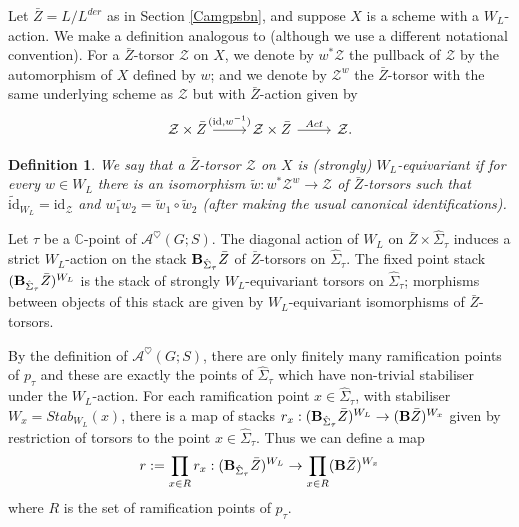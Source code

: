 \documentclass{amsart}
\newtheorem{definition}[theorem]{Definition}
\theoremstyle{remark}
\numberwithin{theorem}{section}
\numberwithin{equation}{section}
\begin{document}
Let $\bar{Z} = L/L^{der}$ as in Section \ref{Camgpsbn}, and suppose $X$ is a scheme with a $W_L$-action. We make a definition analogous to \cite[Definition 5.7]{DG} (although we use a different notational convention). For a $\bar{Z}$-torsor $\mathcal Z$ on $X$, we denote by $w^*\mathcal Z$ the pullback of $\mathcal Z$ by the automorphism of $X$ defined by $w$; and we denote by $\mathcal Z^w$ the $\bar{Z}$-torsor with the same underlying scheme as $\mathcal Z$ but with $\bar{Z}$-action given by
\begin{equation}\label{WTwistTorsoreqn}
\begin{tikzcd}
\mathcal Z \times \bar{Z} \arrow[r, "{(\text{id},w^{-1})}"] & \mathcal Z \times \bar{Z} \arrow[r, "Act"] & \mathcal{Z}.
\end{tikzcd}
\end{equation}

\begin{definition}\label{WLEquivTorsordef}
     We say that a $\bar{Z}$-torsor $\mathcal Z$ on $X$ is \emph{(strongly) $W_L$-equivariant} if for every $w \in W_L$ there is an isomorphism $\widetilde{w}:w^*\mathcal Z^w \rightarrow \mathcal Z$ of $\bar{Z}$-torsors such that $\widetilde{\text{id}}_{W_L} = \text{id}_\mathcal Z$ and $\widetilde{w_1w_2} = \widetilde{w}_1 \circ \widetilde{w}_2$ (after making the usual canonical identifications).
\end{definition}

Let $\tau$ be a $\mathbb{C}$-point of $\mathcal A^\heartsuit(G;S)$. The diagonal action of $W_L$ on $\bar{Z} \times \hat{\Sigma}_\tau$ induces a strict $W_L$-action on the stack ${\bf B}_{\hat\Sigma_\tau}\bar{Z}$ of $\bar{Z}$-torsors on $\hat\Sigma_\tau$. The fixed point stack $({\bf B}_{\hat\Sigma_\tau}\bar{Z})^{W_L}$ is the stack of strongly $W_L$-equivariant torsors on $\hat\Sigma_\tau$; morphisms between objects of this stack are given by $W_L$-equivariant isomorphisms of $\bar{Z}$-torsors.

By the definition of $\mathcal A^\heartsuit(G;S)$, there are only finitely many ramification points of $p_\tau$ and these are exactly the points of $\hat\Sigma_\tau$ which have non-trivial stabiliser under the $W_L$-action. For each ramification point $x \in \hat\Sigma_\tau$, with stabiliser $W_{x}=Stab_{W_L}(x)$, there is a map of stacks $r_x:({\bf B}_{\hat\Sigma_\tau} \bar{Z})^{W_L} \rightarrow (\textbf{B}\bar{Z})^{W_x}$ given by restriction of torsors to the point $x \in \hat\Sigma_\tau$. Thus we can define a map
\begin{equation}\label{WLEquivRestrictioneqn}
    r:=\prod_{x \in R} r_x:({\bf B}_{\hat\Sigma_\tau} \bar{Z})^{W_L} \rightarrow \prod_{x\in R}({\bf B}\bar{Z})^{W_x}
\end{equation}
where $R$ is the set of ramification points of $p_\tau$.
\end{document}
